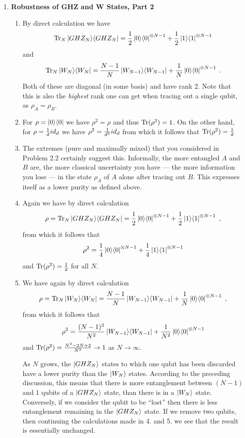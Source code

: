 \documentclass[12pt]{article}
\begin{document}
\begin{enumerate}
\item {\bf Robustness of GHZ and W States, Part 2}

\begin{enumerate}
	\item By direct calculation we have $$\mathrm{Tr}_N \ket{GHZ_N}\!\bra{GHZ_N} = \frac{1}{2}\ket{0}\!\bra{0}^{\otimes {N-1}}+\frac{1}{2}\ket{1}\!\bra{1}^{\otimes {N-1}}$$ and $$\mathrm{Tr}_ N \ket{W_N}\!\bra{W_N} = \frac{N-1}{N}\ket{W_{N-1}}\!\bra{W_{N-1}}+\frac{1}{N}\ket{0}\!\bra{0}^{\otimes {N-1}}\;.$$ Both of these are diagonal (in some basis) and have rank 2. Note that this is also the \emph{highest} rank one can get when tracing out a single qubit, as $\rho_A=\rho_B$.
	
	\item For $\rho =\ket{0}\!\bra{0}$ we have $\rho^2=\rho$ and thus $\mathrm{Tr}(\rho^2)=1$. On the other hand, for $\rho =\frac{1}{d} id_d$ we have $\rho^2=\frac{1}{d^2} id_ d$ from which it follows that $\mathrm{Tr}(\rho^2)=\frac{1}{d}$
	
	\item The extremes (pure and maximally mixed) that you considered in Problem 2.2 certainly suggest this. Informally, the more entangled $A$ and $B$ are, the more classical uncertainty you have --- the more information you lose --- in the state $\rho _ A$ of $A$ alone after tracing out $B$. This expresses itself as a lower purity as defined above.
	
	\item Again we have by direct calculation $$\rho = \mathrm{Tr}_ N \ket{GHZ_N}\!\bra{GHZ_N} = \frac{1}{2}\ket{0}\!\bra{0}^{\otimes {N-1}}+\frac{1}{2}\ket{1}\!\bra{1}^{\otimes {N-1}}\;,$$ from which it follows that $$\rho^2 = \frac{1}{4}\ket{0}\!\bra{0}^{\otimes {N-1}}+\frac{1}{4}\ket{1}\!\bra{1}^{\otimes {N-1}}$$ and $\mathrm{Tr}(\rho^2)=\frac{1}{2}$ for all $N$.
	
	\item We have again by direct calculation
	$$\rho = \mathrm{Tr}_N \ket{W_N}\!\bra{W_N} = \frac{N-1}{N}\ket{W_{N-1}}\!\bra{W_{N-1}}+\frac{1}{N}\ket{0}\!\bra{0}^{\otimes {N-1}}\;,$$ from which it follows that $$\rho ^2 = \frac{(N-1)^2}{N^2}\ket{W_{N-1}}\!\bra{W_{N-1}}+\frac{1}{N^2}\ket{0}\!\bra{0}^{\otimes {N-1}}$$ and $\mathrm{Tr}( \rho ^2) = \frac{N^2-2N+2}{N^2} \rightarrow 1$ as $N \rightarrow \infty$.
	
	As $N$ grows, the $\ket{GHZ_N}$ states to which one qubit has been discarded have a lower purity than the $\ket{W_N}$ states. According to the preceding discussion, this means that there is more entanglement between $(N-1)$ and $1$ qubits of a $\ket{GHZ_N}$ state, than there is in a $\ket{W_N}$ state. Conversely, if we consider the qubit to be ``lost'' then there is less entanglement remaining in the $\ket{GHZ_N}$ state. If we remove two qubits, then continuing the calculations made in 4. and 5. we see that the result is essentially unchanged.
\end{enumerate}

\end{enumerate}
\end{document}

